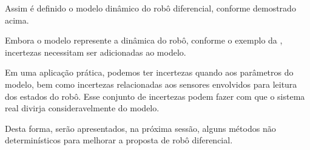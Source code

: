 Assim é definido o modelo dinâmico do robô diferencial, conforme demostrado acima.

Embora o modelo represente a dinâmica do robô, conforme o exemplo da , incertezas necessitam ser adicionadas ao modelo.

Em uma aplicação prática, podemos ter incertezas quando aos parâmetros do modelo, bem como incertezas relacionadas aos sensores envolvidos para leitura dos estados do robô. Esse conjunto de incertezas podem fazer com que o sistema real divirja consideravelmente do modelo.

Desta forma, serão apresentados, na próxima sessão, alguns métodos não determinísticos para melhorar a proposta de robô diferencial.